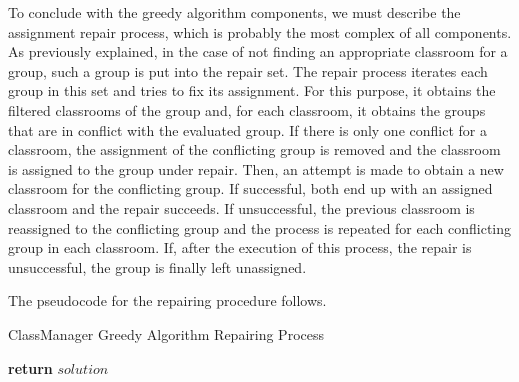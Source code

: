 To conclude with the greedy algorithm components, we must describe the assignment repair process, which is probably the most complex of all components. As previously explained, in the case of not finding an appropriate classroom for a group, such a group is put into the repair set. The repair process iterates each group in this set and tries to fix its assignment. For this purpose, it obtains the filtered classrooms of the group and, for each classroom, it obtains the groups that are in conflict with the evaluated group. If there is only one conflict for a classroom, the assignment of the conflicting group is removed and the classroom is assigned to the group under repair. Then, an attempt is made to obtain a new classroom for the conflicting group. If successful, both end up with an assigned classroom and the repair succeeds. If unsuccessful, the previous classroom is reassigned to the conflicting group and the process is repeated for each conflicting group in each classroom. If, after the execution of this process, the repair is unsuccessful, the group is finally left unassigned.

The pseudocode for the repairing procedure follows.

\begin{algorithm}[H]
    \caption{ClassManager Greedy Algorithm Repairing Process}
    \begin{algorithmic}[1]
                         
                    \EndIf
                         
                    \Else
                         
                    \EndIf
                \EndFor
            \EndFor
            \State \textbf{return} $solution$
        \EndProcedure
    \end{algorithmic}
\end{algorithm}



